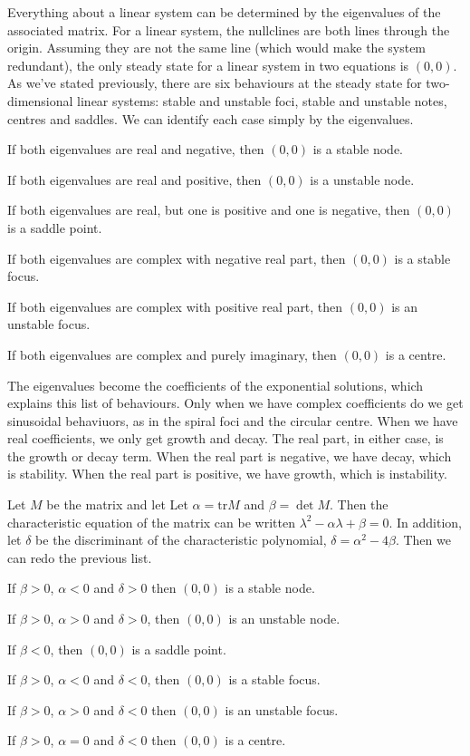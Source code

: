 \documentclass[fleqn,letterpaper]{report}
\begin{document}
Everything about a linear system can be determined by the
eigenvalues of the associated matrix. For a linear system, the
nullclines are both lines through the origin. Assuming they
are not the same line (which would make the system redundant),
the only steady state for a linear system in two equations is
$(0,0)$. As we've stated previously, there are six behaviours
at the steady state for two-dimensional linear systems: stable
and unstable foci, stable and unstable notes, centres and
saddles. We can identify each case simply by the eigenvalues.
\begin{smallitemize}
\item If both eigenvalues are real and negative, then $(0,0)$
is a stable node.
\item If both eigenvalues are real and positive, then $(0,0)$
is a unstable node.
\item If both eigenvalues are real, but one is positive and
one is negative, then $(0,0)$ is a saddle point.
\item If both eigenvalues are complex with negative real part,
then $(0,0)$ is a stable focus.
\item If both eigenvalues are complex with positive real part,
then $(0,0)$ is an unstable focus.
\item If both eigenvalues are complex and purely imaginary,
then $(0,0)$ is a centre.
\end{smallitemize}

The eigenvalues become the coefficients of the 
exponential solutions, which explains this list of
behaviours. Only when we have complex coefficients do we get
sinusoidal behaviuors, as in the spiral foci and the circular
centre. When we have real coefficients, we only get growth
and decay. The real part, in either case, is the growth or
decay term. When the real part is negative, we have decay,
which is stability. When the real part is positive, we have
growth, which is instability.

Let $M$ be the matrix and let Let $\alpha = \text{tr} M$ and $\beta
= \det M$. Then the characteristic equation of the matrix can
be written $\lambda^2 - \alpha \lambda + \beta = 0$. In addition, let
$\delta$ be the discriminant of the characteristic polynomial,
$\delta = \alpha^2 - 4\beta$. Then we can redo the previous list. 
\begin{smallitemize}
\item If $\beta > 0$, $\alpha < 0$ and $\delta > 0$ then $(0,0)$
is a stable node.
\item If $\beta > 0$, $\alpha > 0$ and $\delta > 0$, then
$(0,0)$ is an unstable node.
\item If $\beta < 0$, then $(0,0)$ is a saddle point.
\item If $\beta > 0$, $\alpha < 0$ and $\delta < 0$, 
then $(0,0)$ is a stable focus.
\item If $\beta > 0$, $\alpha> 0$ and $\delta < 0$
then $(0,0)$ is an unstable focus.
\item If $\beta > 0$, $\alpha = 0$ and $\delta < 0$
then $(0,0)$ is a centre.
\end{smallitemize}
\end{document}
